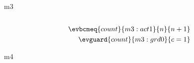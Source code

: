 \documentclass{article}
\begin{document}
\begin{machine}{m3}
	\begin{description}
	\end{description} %
	\begin{align} 
	\end{align}
	\begin{align}
		\evbcmeq{count}{m3:act1}{n}{n+1} \\
		\evguard{count}{m3:grd0}{ c = 1 }
	\end{align}
	
\end{machine}

\begin{machine}{m4}
\end{machine}
\end{document}
